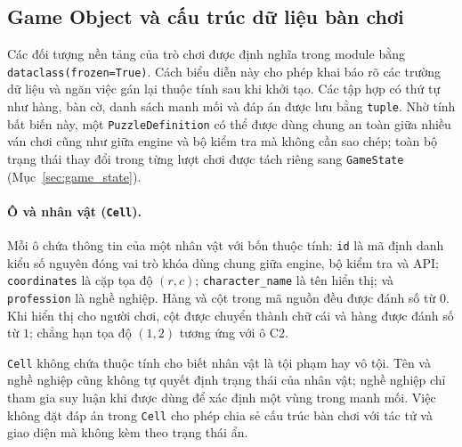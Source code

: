 \subsection{Game Object và cấu trúc dữ liệu bàn chơi}
\label{sec:game_objects}
\label{subsec:game_objects}
\begin{sloppypar}

Các đối tượng nền tảng của trò chơi được định nghĩa trong module  bằng \texttt{dataclass(frozen=True)}. Cách biểu diễn này cho phép khai báo rõ các trường dữ liệu và ngăn việc gán lại thuộc tính sau khi khởi tạo. Các tập hợp có thứ tự như hàng, bàn cờ, danh sách manh mối và đáp án được lưu bằng \texttt{tuple}. Nhờ tính bất biến này, một \texttt{PuzzleDefinition} có thể được dùng chung an toàn giữa nhiều ván chơi cũng như giữa engine và bộ kiểm tra mà không cần sao chép; toàn bộ trạng thái thay đổi trong từng lượt chơi được tách riêng sang \texttt{GameState} (Mục~\ref{sec:game_state}).

\paragraph{Ô và nhân vật (\texttt{Cell}).}
Mỗi ô chứa thông tin của một nhân vật với bốn thuộc tính: \texttt{id} là mã định danh kiểu số nguyên đóng vai trò khóa dùng chung giữa engine, bộ kiểm tra và API; \texttt{coordinates} là cặp tọa độ $(r,c)$; \texttt{character\_name} là tên hiển thị; và \texttt{profession} là nghề nghiệp. Hàng và cột trong mã nguồn đều được đánh số từ $0$. Khi hiển thị cho người chơi, cột được chuyển thành chữ cái và hàng được đánh số từ $1$; chẳng hạn tọa độ $(1,2)$ tương ứng với ô C2.

\texttt{Cell} không chứa thuộc tính cho biết nhân vật là tội phạm hay vô tội. Tên và nghề nghiệp cũng không tự quyết định trạng thái của nhân vật; nghề nghiệp chỉ tham gia suy luận khi được dùng để xác định một vùng trong manh mối. Việc không đặt đáp án trong \texttt{Cell} cho phép chia sẻ cấu trúc bàn chơi với tác tử và giao diện mà không kèm theo trạng thái ẩn.


\end{sloppypar}
